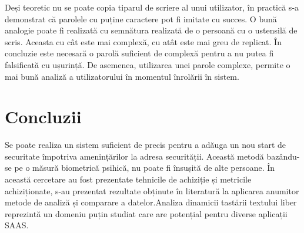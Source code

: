 \documentclass[9pt,shortpaper,twoside,web]{ieeecolor}
\begin{document}
	Deși teoretic nu se poate copia tiparul de scriere al unui utilizator, în practică s-a demonstrat că parolele cu puține caractere pot fi imitate cu succes. O bună analogie poate fi realizată cu semnătura realizată de o persoană cu o ustensilă de scris. Aceasta cu cât este mai complexă, cu atât este mai greu de replicat. În concluzie este necesară o parolă suficient de complexă pentru a nu putea fi falsificată cu ușurință. De asemenea, utilizarea unei parole complexe, permite o mai bună analiză a utilizatorului în momentul înrolării în sistem. 
	

\section{Concluzii}
	Se poate realiza un sistem suficient de precis pentru a adăuga un nou start de securitate împotriva amenințărilor la adresa securității. Această metodă bazându-se pe o măsură biometrică psihică, nu poate fi însușită de alte persoane. În această cercetare au fost prezentate tehnicile de achiziție și metricile achiziționate, s-au prezentat rezultate obținute în literatură la aplicarea anumitor metode de analiză și comparare a datelor.Analiza dinamicii tastării textului liber reprezintă un domeniu puțin studiat care are potențial pentru diverse aplicații SAAS.
\end{document}
